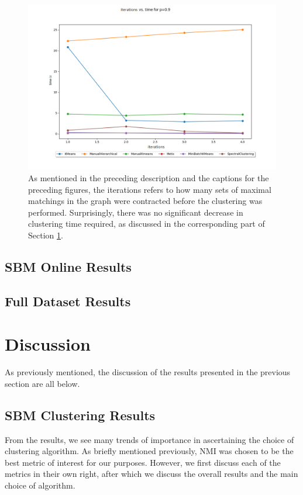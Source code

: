 \documentclass{article}
\begin{document}
\begin{figure}[H]
    \label{fig:results_coarsen_time}
    \centering
    \includegraphics[width=1.0\textwidth]{results/results_coarsen_time.png}
    \caption[Clustering time vs. coarsening iterations]{As mentioned in the preceding description and the captions for the preceding figures, the iterations refers to how many sets of maximal matchings in the graph were contracted before the clustering was performed. Surprisingly, there was no significant decrease in clustering time required, as discussed in the corresponding part of Section \ref{discussion}.}
\end{figure}

\subsection{SBM Online Results}

\subsection{Full Dataset Results}

\clearpage
\section{Discussion}\label{discussion}
As previously mentioned, the discussion of the results presented in the previous section are all below. 

\subsection{SBM Clustering Results}
From the results, we see many trends of importance in ascertaining the choice of clustering algorithm. As briefly mentioned previously, NMI was chosen to be the best metric of interest for our purposes. However, we first discuss each of the metrics in their own right, after which we discuss the overall results and the main choice of algorithm.
\end{document}
